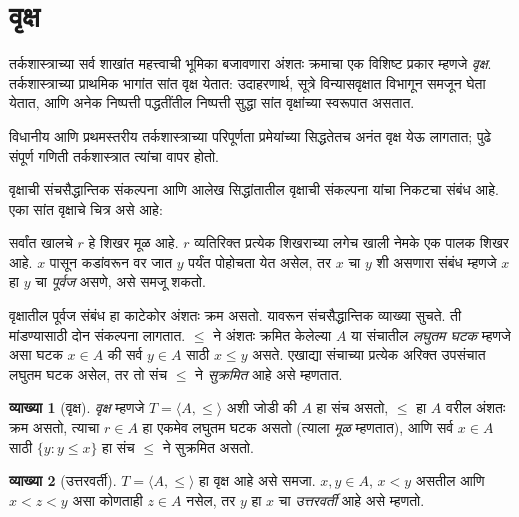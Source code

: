 \documentclass[11pt,a4paper,openany]{book}
\theoremstyle{definition}
\newtheorem{defn}{व्याख्या}[section]
\newcommand{\Setabs}[2]{\{#1:#2\}}
\newcommand{\tuple}[1]{\langle #1\rangle}
\begin{document}
\section{वृक्ष}\label{sfr:rel:tre:sec}

तर्कशास्त्राच्या सर्व शाखांत महत्त्वाची भूमिका बजावणारा अंशतः क्रमाचा
एक विशिष्ट प्रकार म्हणजे \emph{वृक्ष}. तर्कशास्त्राच्या प्राथमिक भागांत
सांत वृक्ष येतात: उदाहरणार्थ, सूत्रे विन्यासवृक्षात विभागून
समजून घेता येतात, आणि अनेक निष्पत्ती पद्धतींतील
निष्पत्ती सुद्धा सांत वृक्षांच्या स्वरूपात असतात.

विधानीय आणि प्रथमस्तरीय तर्कशास्त्राच्या परिपूर्णता प्रमेयांच्या सिद्धतेतच
अनंत वृक्ष येऊ लागतात; पुढे संपूर्ण गणिती तर्कशास्त्रात त्यांचा वापर होतो.

वृक्षाची संचसैद्धान्तिक संकल्पना आणि आलेख सिद्धांतातील वृक्षाची संकल्पना
यांचा निकटचा संबंध आहे. एका सांत वृक्षाचे चित्र असे आहे:

\begin{center}
\end{center}

सर्वांत खालचे $r$ हे शिखर मूळ आहे. $r$ व्यतिरिक्त प्रत्येक शिखराच्या
लगेच खाली नेमके एक पालक शिखर आहे. $x$ पासून कडांवरून वर जात $y$ पर्यंत
पोहोचता येत असेल, तर $x$ चा $y$ शी असणारा संबंध म्हणजे $x$ हा $y$ चा
\emph{पूर्वज} असणे, असे समजू शकतो.

वृक्षातील पूर्वज संबंध हा काटेकोर अंशतः क्रम असतो. यावरून संचसैद्धान्तिक
व्याख्या सुचते. ती मांडण्यासाठी दोन संकल्पना लागतात. $\le$ ने अंशतः
क्रमित केलेल्या $A$ या संचातील \emph{लघुतम घटक} म्हणजे असा
घटक $x \in A$ की सर्व $y \in A$ साठी $x \le y$ असते.
एखाद्या संचाच्या प्रत्येक अरिक्त उपसंचात लघुतम घटक असेल, तर तो संच
$\le$ ने \emph{सुक्रमित} आहे असे म्हणतात.

\begin{defn}[वृक्ष]
\emph{वृक्ष} म्हणजे $T = \tuple{A, \le}$ अशी जोडी की $A$ हा संच असतो,
$\le$ हा $A$ वरील अंशतः क्रम असतो, त्याचा $r \in A$ हा एकमेव लघुतम
घटक असतो (त्याला \emph{मूळ} म्हणतात), आणि सर्व $x \in A$ साठी
$\Setabs{y}{y \le x}$ हा संच $\le$ ने सुक्रमित असतो.
\end{defn}

\begin{defn}[उत्तरवर्ती]
$T = \tuple{A, \le}$ हा वृक्ष आहे असे समजा.
$x,y \in A$, $x < y$ असतील आणि $x < z < y$ असा कोणताही $z \in A$
नसेल, तर $y$ हा $x$ चा \emph{उत्तरवर्ती} आहे असे म्हणतो.
\end{defn}
\end{document}

